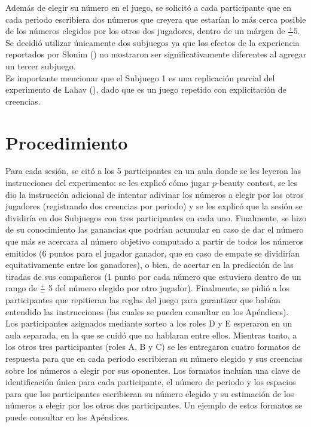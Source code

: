Además de elegir su número en el juego, se solicitó a cada participante que en cada periodo escribiera dos números que creyera que estarían lo más cerca posible de los números elegidos por los otros dos jugadores, dentro de un márgen de $\frac{+}{-}5$.\\

Se decidió utilizar únicamente dos subjuegos ya que los efectos de la experiencia reportados por Slonim (\citeyear{Slonim}) no mostraron ser significativamente diferentes al agregar un tercer subjuego.\\

Es importante mencionar que el Subjuego 1 es una replicación parcial del experimento de Lahav (\citeyear{Lahav}), dado que es un juego repetido con explicitación de creencias.

\section{Procedimiento}

Para cada sesión, se citó a los 5 participantes en un aula donde se les leyeron las instrucciones del experimento: se les explicó cómo jugar $p$-beauty contest, se les dio la instrucción adicional de intentar adivinar los números a elegir por los otros jugadores (registrando dos creencias por periodo) y se les explicó que la sesión se dividiría en dos Subjuegos con tres participantes en cada uno. Finalmente, se hizo de su conocimiento las ganancias que podrían acumular en caso de dar el número que más se acercara al número objetivo computado a partir de todos los números emitidos (6 puntos para el jugador ganador, que en caso de empate se dividirían equitativamente entre los ganadores), o bien, de acertar en la predicción de las tiradas de sus compañeros (1 punto por cada número que estuviera dentro de un rango de $\frac{+}{-}$ 5 del número elegido por otro jugador). Finalmente, se pidió a los participantes que repitieran las reglas del juego para garantizar que habían entendido las instrucciones (las cuales se pueden consultar en los Apéndices).\\

Los participantes asignados mediante sorteo a los roles D y E esperaron en un aula separada, en la que se cuidó que no hablaran entre ellos. Mientras tanto, a los otros tres participantes (roles A, B y C) se les entregaron cuatro formatos de respuesta para que en cada periodo escribieran su número elegido y sus creencias sobre los números a elegir por sus oponentes. Los formatos incluían una clave de identificación única para cada participante, el número de periodo y los espacios para que los participantes escribieran su número elegido y su estimación de los números a elegir por los otros dos participantes. Un ejemplo de estos formatos se puede consultar en los Apéndices.\\


